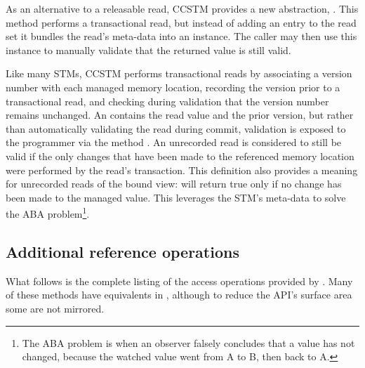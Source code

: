 As an alternative to a releasable read, CCSTM provides a new
abstraction, .  This method performs a
transactional read, but instead of adding an entry to the read set it
bundles the read's meta-data into an  instance.
The caller may then use this instance to manually validate that the
returned value is still valid.

Like many STMs, CCSTM performs transactional reads by associating a
version number with each managed memory location, recording the version
prior to a transactional read, and checking during validation that the
version number remains unchanged.  An  contains the
read value and the prior version, but rather than automatically validating
the read during commit, validation is exposed to the programmer via the
method .  An unrecorded read is considered to still be
valid if the only changes that have been made to the referenced memory
location were performed by the read's transaction.  This definition also
provides a meaning for unrecorded reads of the  bound view:
 will return true only if no change has been made to the
managed value.  This leverages the STM's meta-data to solve
the ABA problem\footnote{The ABA problem is when an observer falsely
concludes that a value has not changed, because the watched value went
from A to B, then back to A.}.

\subsection{Additional reference operations}

What follows is the complete listing of the access operations provided by
.  Many of these methods have equivalents in ,
although to reduce the API's surface area some are not mirrored.


